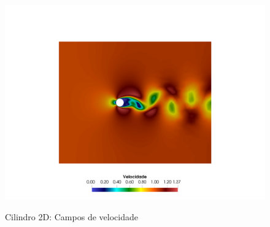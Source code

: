\documentclass[tese_patricia]{subfiles}%
\begin{document}
\begin{figure}[htb!]
	 \\
	{\includegraphics[trim=10cm 0cm 10cm 32cm,clip=true,scale=0.3]{Imagens/Cap2/vel2080.pdf}} \\
	\caption{Cilindro 2D: Campos de velocidade}
	\label{fig:cilindro_campos_velocidade}
\end{figure}
\end{document}
